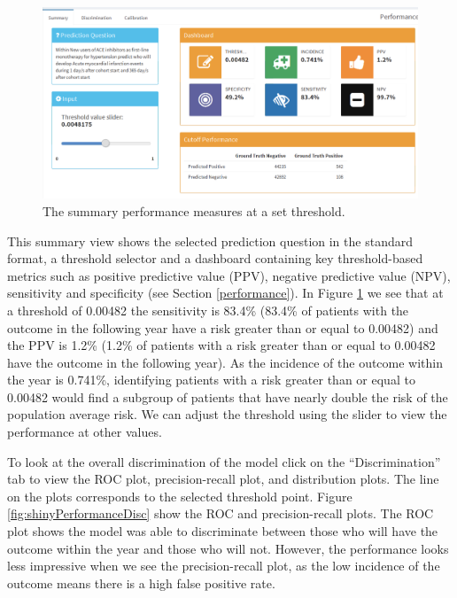 \documentclass[11pt]{book}
\theoremstyle{definition}
\theoremstyle{definition}
\theoremstyle{definition}
\theoremstyle{remark}
\begin{document}
\begin{figure}

{\centering \includegraphics[width=1\linewidth]{images/PatientLevelPrediction/shiny/shinyPerformanceSum} 

}

\caption{The summary performance measures at a set threshold.}\label{fig:shinyPerformanceSum}
\end{figure}

This summary view shows the selected prediction question in the standard
format, a threshold selector and a dashboard containing key
threshold-based metrics such as positive predictive value (PPV),
negative predictive value (NPV), sensitivity and specificity (see
Section \ref{performance}). In Figure \ref{fig:shinyPerformanceSum} we
see that at a threshold of 0.00482 the sensitivity is 83.4\% (83.4\% of
patients with the outcome in the following year have a risk greater than
or equal to 0.00482) and the PPV is 1.2\% (1.2\% of patients with a risk
greater than or equal to 0.00482 have the outcome in the following
year). As the incidence of the outcome within the year is 0.741\%,
identifying patients with a risk greater than or equal to 0.00482 would
find a subgroup of patients that have nearly double the risk of the
population average risk. We can adjust the threshold using the slider to
view the performance at other values.

To look at the overall discrimination of the model click on the
``Discrimination'' tab to view the ROC plot, precision-recall plot, and
distribution plots. The line on the plots corresponds to the selected
threshold point. Figure \ref{fig:shinyPerformanceDisc} show the ROC and
precision-recall plots. The ROC plot shows the model was able to
discriminate between those who will have the outcome within the year and
those who will not. However, the performance looks less impressive when
we see the precision-recall plot, as the low incidence of the outcome
means there is a high false positive rate.
\end{document}
